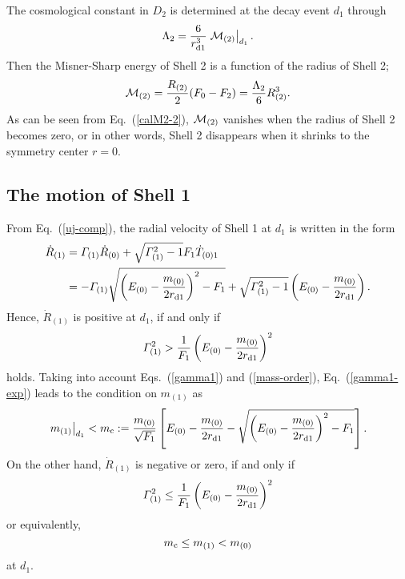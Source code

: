 \documentclass[aps,preprint,preprintnumber,nofootinbib,amsmath,amssymb,ascmac,bm,12pt]{revtex4}
\newcommand{\rdo}{r_{\rm d1}}
\newcommand{\mz}{m_{(0)}}
\newcommand{\mo}{m_{(1)}}
\newcommand{\mc}{m_{\rm c}}
\newcommand{\Go}{\varGamma_{(1)}}
\newcommand{\Rtw}{R_{(2)}}
\newcommand{\Eze}{E_{(0)}}
\begin{document}
The cosmological constant in $D_2$ is determined at the decay event $d_1$ through 
\begin{equation}
\Lambda_2=\frac{6}{\rdo^3}\left.{\cal M}_{(2)}\right|_{d_1}. \label{Lambda}
\end{equation}
Then the Misner-Sharp energy of Shell 2 
is a function of the radius of Shell 2; 
\begin{equation}
{\cal M}_{(2)}=\frac{\Rtw}{2}(F_0-F_2)=\frac{\Lambda_2}{6}\Rtw^3. \label{calM2-2}
\end{equation}
As can be seen from Eq.~(\ref{calM2-2}), ${\cal M}_{(2)}$ vanishes  
when the radius of Shell 2 becomes zero, or in other words, Shell 2 disappears when it shrinks 
to the symmetry center $r=0$.  

\subsection{The motion of Shell 1}

From Eq.~(\ref{uj-comp}), the radial velocity of Shell 1 at $d_1$ is written in the form
\begin{align}
\dot{R}_{(1)}&=\Go \dot{R}_{(0)}+\sqrt{\Go^2-1}F_1\dot{T}_{(0)1} \nonumber \\
&=-\Go \sqrt{\left(\Eze-\frac{\mz}{2\rdo}\right)^2-F_1} +\sqrt{\Go^2-1}\left(\Eze-\frac{\mz}{2\rdo}\right).
\end{align}
Hence, $\dot{R}_{(1)}$ is positive at $d_1$, if and only if 
\begin{equation}
\Go^2 > \frac{1}{F_1}\left(\Eze-\frac{\mz}{2\rdo}\right)^2 \label{gamma1-exp}
\end{equation}
holds. 
Taking into account Eqs.~(\ref{gamma1}) and (\ref{mass-order}), Eq.~(\ref{gamma1-exp}) leads to the condition on $\mo$ as
\begin{equation}
\left.\mo\right|_{d_1}<\mc:=\frac{\mz}{\sqrt{F_1}}\left[\Eze-\frac{\mz}{2\rdo}-\sqrt{\left(\Eze-\frac{\mz}{2\rdo}\right)^2-F_1}\right].
\label{m1-exp}
\end{equation}
On the other hand, $\dot{R}_{(1)}$ is negative or zero, if and only if 
\begin{equation}
\Go^2 \leq \frac{1}{F_1}\left(\Eze-\frac{\mz}{2\rdo}\right)^2 \label{gamma1-con}
\end{equation}
or equivalently, 
\begin{equation}
\mc \leq\mo<\mz
\label{m1-con}
\end{equation}
at $d_1$. 
\end{document}
